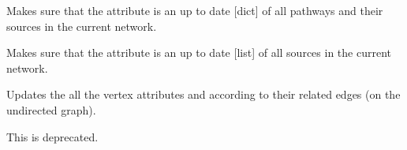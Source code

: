\documentclass[letterpaper,10pt,english]{sphinxmanual}
\begin{document}
\begin{fulllineitems}
\begin{fulllineitems}
\label{\detokenize{reference:pypath.main.PyPath.update_pathways}}
Makes sure that the 
attribute is an up to date {[}dict{]} of all pathways and their
sources in the current network.

\end{fulllineitems}


\begin{fulllineitems}
\label{\detokenize{reference:pypath.main.PyPath.update_sources}}
Makes sure that the 
attribute is an up to date {[}list{]} of all sources in the current
network.

\end{fulllineitems}


\begin{fulllineitems}
\label{\detokenize{reference:pypath.main.PyPath.update_vertex_sources}}
Updates the all the vertex attributes  and
 according to their related edges (on the
undirected graph).

\end{fulllineitems}


\begin{fulllineitems}
\label{\detokenize{reference:pypath.main.PyPath.update_vindex}}
This is deprecated.

\end{fulllineitems}



\end{fulllineitems}
\end{document}

